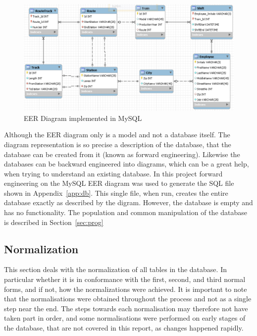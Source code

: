 \begin{figure}
    \centering
    \includegraphics{img/EER.png}
    \caption{EER Diagram implemented in MySQL}
    \label{fig:EER}
\end{figure}

Although the EER diagram only is a model and not a database itself. The diagram 
representation is so precise a description of the database, that the database 
can be created from it (known as forward engineering). Likewise the databases 
can be backward engineered into diagrams, which can be a great help, when 
trying to understand an existing database. In this project forward engineering 
on the MySQL EER diagram was used to generate the SQL file shown in 
Appendix~\ref{app:db}. This single file, when run, creates the entire database 
exactly as described by the digram. However, the database is empty and has no 
functionality. The population and common manipulation of the database is 
described in Section~\ref{sec:prog}

\subsection{Normalization}
This section deals with the normalization of all tables in the database. In 
particular whether it is in conformance with the first, second, and third 
normal forms, and if not, how the normalizations were achieved. It is important 
to note that the normalisations were obtained throughout the process and not as 
a single step near the end. The steps towards each normalisation may therefore 
not have taken part in order, and some normalisations were performed on early 
stages of the database, that are not covered in this report, as changes 
happened rapidly. 

